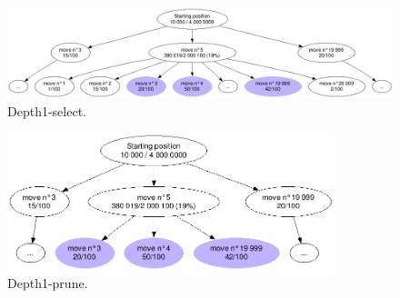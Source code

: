 \begin{figure}[H]
\centering
	\includegraphics[width=\textwidth]{3Methods/3.2MCTS/img/depth1-select.png}
	\caption{\label{fig:depth1-select}Depth1-select.}
\end{figure}

\begin{figure}[H]
\centering
	\includegraphics[height=4cm]{3Methods/3.2MCTS/img/depth1-prune.png}
	\caption{\label{fig:depth1-prune}Depth1-prune.}
\end{figure}
